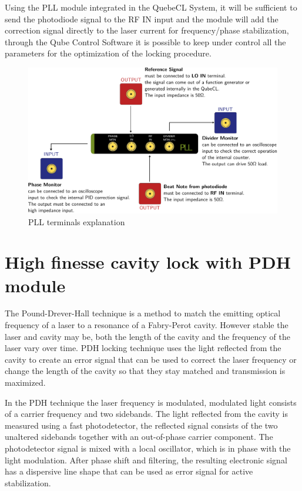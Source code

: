 Using the PLL module integrated in the QuebeCL System, it will be sufficient to send the photodiode signal to the RF IN input and the module will add the correction signal directly to the laser current for frequency/phase stabilization, through the Qube Control Software it is possible to keep under control all the parameters for the optimization of the locking procedure.

\begin{figure}[H]
\centering
\includegraphics[width=12cm]{images/PLL_INPUT_EXPLANATION.pdf}
\caption{PLL terminals explanation}
\end{figure}


\newpage
\section{High finesse cavity lock with PDH module}

The Pound-Drever-Hall technique is a method to match the emitting optical frequency of a laser to a resonance of a Fabry-Perot cavity.
However stable the laser and cavity may be, both the length of the cavity and the frequency of the laser vary over time.
PDH locking technique uses the light reflected from the cavity to create an error signal that can be used to correct the laser frequency or change the length of the cavity so that they stay matched and transmission is maximized.

In the PDH technique the laser frequency is modulated, modulated light consists of a carrier frequency and two sidebands.
The light reflected from the cavity is measured using a fast photodetector, the reflected signal consists of the two unaltered sidebands together with an out-of-phase carrier component.
\newline
The photodetector signal is mixed with a local oscillator, which is in phase with the light modulation. After phase shift and filtering, the resulting electronic signal has a dispersive line shape that can be used as error signal for active stabilization.

